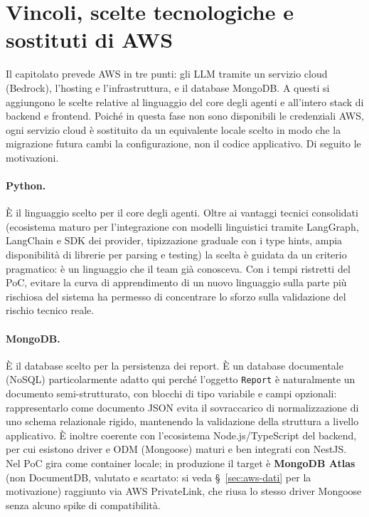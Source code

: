 \documentclass[11pt,a4paper]{article}
\begin{document}
\section{Vincoli, scelte tecnologiche e sostituti di AWS}
\label{sec:tecnologie}

Il capitolato prevede AWS in tre punti: gli LLM tramite un servizio cloud (Bedrock), l'hosting e l'infrastruttura, e il database MongoDB. A questi si aggiungono le scelte relative al linguaggio del core degli agenti e all'intero stack di backend e frontend. Poiché in questa fase non sono disponibili le credenziali AWS, ogni servizio cloud è sostituito da un equivalente locale scelto in modo che la migrazione futura cambi la configurazione, non il codice applicativo. Di seguito le motivazioni.

\paragraph{Python.} È il linguaggio scelto per il core degli agenti. Oltre ai vantaggi tecnici consolidati (ecosistema maturo per l'integrazione con modelli linguistici tramite LangGraph, LangChain e SDK dei provider, tipizzazione graduale con i type hints, ampia disponibilità di librerie per parsing e testing) la scelta è guidata da un criterio pragmatico: è un linguaggio che il team già conosceva. Con i tempi ristretti del PoC, evitare la curva di apprendimento di un nuovo linguaggio sulla parte più rischiosa del sistema ha permesso di concentrare lo sforzo sulla validazione del rischio tecnico reale.

\paragraph{MongoDB.} È il database scelto per la persistenza dei report. È un database documentale (NoSQL) particolarmente adatto qui perché l'oggetto \texttt{Report} è naturalmente un documento semi-strutturato, con blocchi di tipo variabile e campi opzionali: rappresentarlo come documento JSON evita il sovraccarico di normalizzazione di uno schema relazionale rigido, mantenendo la validazione della struttura a livello applicativo. È inoltre coerente con l'ecosistema Node.js/TypeScript del backend, per cui esistono driver e ODM (Mongoose) maturi e ben integrati con NestJS. Nel PoC gira come container locale; in produzione il target è \textbf{MongoDB Atlas} (non DocumentDB, valutato e scartato: si veda \S~\ref{sec:aws-dati} per la motivazione) raggiunto via AWS PrivateLink, che riusa lo stesso driver Mongoose senza alcuno spike di compatibilità.
\end{document}
